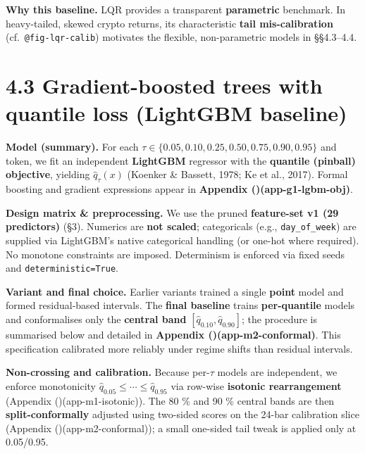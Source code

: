 \documentclass[
  a4paper,
  DIV=11,
  numbers=noendperiod]{scrreprt}
\begin{document}
\textbf{Why this baseline.} LQR provides a transparent
\textbf{parametric} benchmark. In heavy-tailed, skewed crypto returns,
its characteristic \textbf{tail mis-calibration}
(cf.~\texttt{@fig-lqr-calib}) motivates the flexible, non-parametric
models in §§4.3--4.4.

\section{4.3 Gradient-boosted trees with quantile loss (LightGBM
baseline)}\label{gradient-boosted-trees-with-quantile-loss-lightgbm-baseline}

\textbf{Model (summary).} For each
\(\tau\in\{0.05,0.10,0.25,0.50,0.75,0.90,0.95\}\) and token, we fit an
independent \textbf{LightGBM} regressor with the \textbf{quantile
(pinball) objective}, yielding \(\widehat q_\tau(x)\) (Koenker \&
Bassett, 1978; Ke et al., 2017). Formal boosting and gradient
expressions appear in \textbf{Appendix
()(app-g1-lgbm-obj)}.

\textbf{Design matrix \& preprocessing.} We use the pruned
\textbf{feature-set v1 (29 predictors)} (§3). Numerics are \textbf{not
scaled}; categoricals (e.g., \texttt{day\_of\_week}) are supplied via
LightGBM's native categorical handling (or one-hot where required). No
monotone constraints are imposed. Determinism is enforced via fixed
seeds and \texttt{deterministic=True}.

\textbf{Variant and final choice.} Earlier variants trained a single
\textbf{point} model and formed residual-based intervals. The
\textbf{final baseline} trains \textbf{per-quantile} models and
conformalises only the \textbf{central band}
\([\widehat q_{0.10},\widehat q_{0.90}]\); the procedure is summarised
below and detailed in \textbf{Appendix
()(app-m2-conformal)}. This
specification calibrated more reliably under regime shifts than residual
intervals.

\textbf{Non-crossing and calibration.} Because per-\(\tau\) models are
independent, we enforce monotonicity
\(\widehat q_{0.05}\le\cdots\le\widehat q_{0.95}\) via row-wise
\textbf{isotonic rearrangement} (Appendix
()(app-m1-isotonic)). The 80 \% and 90
\% central bands are then \textbf{split-conformally} adjusted using
two-sided scores on the 24-bar calibration slice (Appendix
()(app-m2-conformal)); a small
one-sided tail tweak is applied only at 0.05/0.95.
\end{document}
